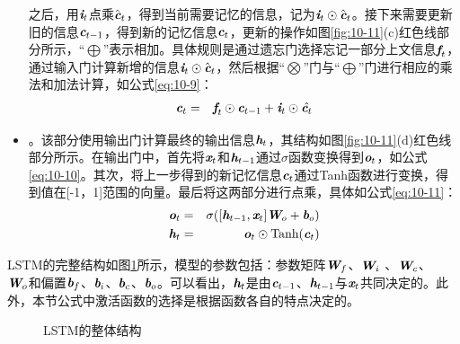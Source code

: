 \begin{itemize}
之后，用$\textbf{\em i}_t$点乘$\hat{\textbf{\em c}}_t$，得到当前需要记忆的信息，记为$\textbf{\em i}_t \odot  \hat{\textbf{\em c}}_t$。接下来需要更新旧的信息$\textbf{\em c}_{t-1}$，得到新的记忆信息$\textbf{\em c}_t$，更新的操作如图\ref{fig:10-11}(c)红色线部分所示，“$\bigoplus$”表示相加。具体规则是通过遗忘门选择忘记一部分上文信息$\textbf{\em f}_t$，通过输入门计算新增的信息$\textbf{\em i}_t \odot  \hat{\textbf{\em c}}_t$，然后根据“$\bigotimes$”门与“$\bigoplus$”门进行相应的乘法和加法计算，如公式\eqref{eq:10-9}：
\begin{eqnarray}
\textbf{\em c}_t &=& \textbf{\em f}_t \odot \textbf{\em c}_{t-1} + \textbf{\em i}_t  \odot \hat{\textbf{\em c}_t}
\label{eq:10-9}
\end{eqnarray}
\vspace{-1.0em}
\item {\small{}}。该部分使用输出门计算最终的输出信息$\textbf{\em h}_t$，其结构如图\ref{fig:10-11}(d)红色线部分所示。在输出门中，首先将$\textbf{\em x}_t$和$\textbf{\em h}_{t-1}$通过$\sigma$函数变换得到$\textbf{\em o}_t$，如公式\eqref{eq:10-10}。其次，将上一步得到的新记忆信息$\textbf{\em c}_t$通过Tanh函数进行变换，得到值在[-1，1]范围的向量。最后将这两部分进行点乘，具体如公式\eqref{eq:10-11}：
\begin{eqnarray}
\textbf{\em o}_t & = & \sigma ([\textbf{\em h}_{t-1},\textbf{\em x}_{t}] \textbf{\em W}_o + \textbf{\em b}_o ) \label{eq:10-10} \\
\textbf{\em h}_t & = & \textbf{\em o}_t \odot \textrm{Tanh} (\textbf{\em c}_t) \label{eq:10-11}
\end{eqnarray}
\vspace{0.5em}
\end{itemize}


\parinterval LSTM的完整结构如图\ref{fig:10-12}所示，模型的参数包括：参数矩阵$\textbf{\em W}_f$、$\textbf{\em W}_i$ 、$\textbf{\em W}_c$、\\$\textbf{\em W}_o$和偏置$\textbf{\em b}_f$、$\textbf{\em b}_i$、$\textbf{\em b}_c$、$\textbf{\em b}_o$。可以看出，$\textbf{\em h}_t$是由$\textbf{\em c}_{t-1}$、$\textbf{\em h}_{t-1}$与$\textbf{\em x}_t$共同决定的。此外，本节公式中激活函数的选择是根据函数各自的特点决定的。

\begin{figure}[htp]
\centering

\caption{LSTM的整体结构}
\label{fig:10-12}
\end{figure}


